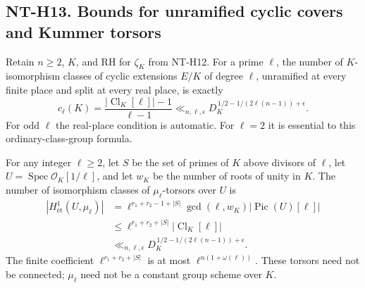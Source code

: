 \subsection*{NT-H13. Bounds for unramified cyclic covers and Kummer torsors}
Retain $n\ge2$, $K$, and RH for $\zeta_K$ from NT-H12.
For a prime $\ell$, the number of $K$-isomorphism classes of cyclic
extensions $E/K$ of degree $\ell$, unramified at every finite place
and split at every real place, is exactly
\[
 c_\ell(K)=\frac{|\operatorname{Cl}_K[\ell]|-1}{\ell-1}
       \ll_{n,\ell,\epsilon}
       D_K^{\,1/2-1/(2\ell(n-1))+\epsilon}.             \tag{NT-H13a}
\]
For odd $\ell$ the real-place condition is automatic. For $\ell=2$
it is essential to this ordinary-class-group formula.

For any integer $\ell\ge2$, let $S$ be the set of primes of $K$
above divisors of $\ell$, let $U=\operatorname{Spec}\mathcal O_K[1/\ell]$,
and let $w_K$ be the number of roots of unity in $K$. The number of
isomorphism classes of $\mu_\ell$-torsors over $U$ is
\[
 \begin{split}
 |H^1_{\text{ét}}(U,\mu_\ell)|
  &=\ell^{r_1+r_2-1+|S|}\gcd(\ell,w_K)
                             |\operatorname{Pic}(U)[\ell]|\\
  &\le\ell^{r_1+r_2+|S|}|\operatorname{Cl}_K[\ell]|\\
  &\ll_{n,\ell,\epsilon}
                 D_K^{\,1/2-1/(2\ell(n-1))+\epsilon}.
 \end{split}                                           \tag{NT-H13b}
\]
The finite coefficient $\ell^{r_1+r_2+|S|}$ is at most
$\ell^{n(1+\omega(\ell))}$. These torsors need not be connected;
$\mu_\ell$ need not be a constant group scheme over $K$.

